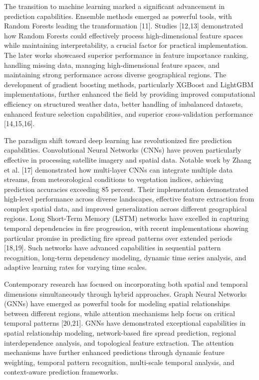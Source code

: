 The transition to machine learning marked a significant advancement in prediction capabilities. Ensemble methods emerged as powerful tools, with Random Forests leading the transformation [11]. Studies [12,13] demonstrated how Random Forests could effectively process high-dimensional feature spaces while maintaining interpretability, a crucial factor for practical implementation. The later works showcased superior performance in feature importance ranking, handling missing data, managing high-dimensional feature spaces, and maintaining strong performance across diverse geographical regions. The development of gradient boosting methods, particularly XGBoost and LightGBM implementations, further enhanced the field by providing improved computational efficiency on structured weather data, better handling of imbalanced datasets, enhanced feature selection capabilities, and superior cross-validation performance [14,15,16].

The paradigm shift toward deep learning has revolutionized fire prediction capabilities. Convolutional Neural Networks (CNNs) have proven particularly effective in processing satellite imagery and spatial data. Notable work by Zhang et al. [17] demonstrated how multi-layer CNNs can integrate multiple data streams, from meteorological conditions to vegetation indices, achieving prediction accuracies exceeding 85 percent. Their implementation demonstrated high-level performance across diverse landscapes, effective feature extraction from complex spatial data, and improved generalization across different geographical regions. Long Short-Term Memory (LSTM) networks have excelled in capturing temporal dependencies in fire progression, with recent implementations showing particular promise in predicting fire spread patterns over extended periods [18,19]. Such networks have advanced capabilities in sequential pattern recognition, long-term dependency modeling, dynamic time series analysis, and adaptive learning rates for varying time scales.

Contemporary research has focused on incorporating both spatial and temporal dimensions simultaneously through hybrid approaches. Graph Neural Networks (GNNs) have emerged as powerful tools for modeling spatial relationships between different regions, while attention mechanisms help focus on critical temporal patterns [20,21]. GNNs have demonstrated exceptional capabilities in spatial relationship modeling, network-based fire spread prediction, regional interdependence analysis, and topological feature extraction. The attention mechanisms have further enhanced predictions through dynamic feature weighting, temporal pattern recognition, multi-scale temporal analysis, and context-aware prediction frameworks.

